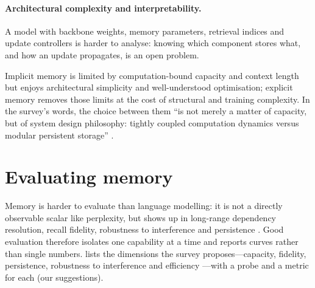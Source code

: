 \paragraph{Architectural complexity and interpretability.} A model with backbone weights, memory
parameters, retrieval indices and update controllers is harder to analyse: knowing which component
stores what, and how an update propagates, is an open problem.

Implicit memory is limited by computation-bound capacity and context length but enjoys
architectural simplicity and well-understood optimisation; explicit memory removes those limits at
the cost of structural and training complexity. In the survey's words, the choice between them
``is not merely a matter of capacity, but of system design philosophy: tightly coupled computation
dynamics versus modular persistent storage'' \citep[\S IV-E]{zhoubian2026memory}.

\section{Evaluating memory}\label{sec:c02-eval}

Memory is harder to evaluate than language modelling: it is not a directly observable scalar like
perplexity, but shows up in long-range dependency resolution, recall fidelity, robustness to
interference and persistence \citep[\S V-C]{zhoubian2026memory}. Good evaluation therefore isolates
one capability at a time and reports curves rather than single numbers. 
lists the dimensions the survey proposes---capacity, fidelity, persistence, robustness to
interference and efficiency \citep[\S VI-F]{zhoubian2026memory}---with a probe and a metric for each
(our suggestions).

